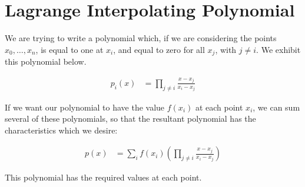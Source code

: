 \documentclass{article}
\begin{document}
\section{Lagrange Interpolating Polynomial}

We are trying to write a polynomial which, if we are considering
	the points $x_0, \dots, x_n$, is equal to one at $x_i$,
	and equal to zero for all $x_j$, with $j \neq i$.
We exhibit this polynomial below.

\begin{align}
p_i(x) & = \prod_{j \neq i} \frac{x - x_j}{x_i - x_j}
\end{align}

If we want our polynomial to have the value $f(x_i)$ at each
	point $x_i$, we can sum several of these polynomials, so that
	the resultant polynomial has the characteristics which we desire:

\begin{align}
p(x) & = \sum_i f(x_i) 
	\left( \prod_{j \neq i} \frac{x-x_j}{x_i-x_j} \right)
\end{align}

This polynomial has the required values at each point.
\end{document}
